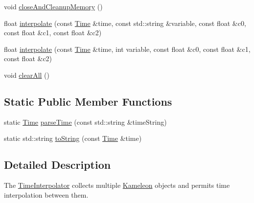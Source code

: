 \begin{DoxyCompactItemize}
\item 
void \hyperlink{classccmc_1_1_time_interpolator_ab1063eb20024f1f3e9923b1cff0a4060}{close\-And\-Cleanup\-Memory} ()
\item 
float \hyperlink{classccmc_1_1_time_interpolator_ab80987872d9d6d58c49d30a86e499e86}{interpolate} (const \hyperlink{classccmc_1_1_time}{Time} \&time, const std\-::string \&variable, const float \&c0, const float \&c1, const float \&c2)
\item 
float \hyperlink{classccmc_1_1_time_interpolator_ac8a3ca21476a05edf2ea427369266505}{interpolate} (const \hyperlink{classccmc_1_1_time}{Time} \&time, int variable, const float \&c0, const float \&c1, const float \&c2)
\item 
void \hyperlink{classccmc_1_1_time_interpolator_a6295ebae47e50a0d80fd646a294d4ccd}{clear\-All} ()
\end{DoxyCompactItemize}
\subsection*{Static Public Member Functions}
\begin{DoxyCompactItemize}
\item 
static \hyperlink{classccmc_1_1_time}{Time} \hyperlink{classccmc_1_1_time_interpolator_a0d265523f630f65ba2f905cda85a66eb}{parse\-Time} (const std\-::string \&time\-String)
\item 
static std\-::string \hyperlink{classccmc_1_1_time_interpolator_ab14064752057b303dce510fd9b44caf2}{to\-String} (const \hyperlink{classccmc_1_1_time}{Time} \&time)
\end{DoxyCompactItemize}


\subsection{Detailed Description}
The \hyperlink{classccmc_1_1_time_interpolator}{Time\-Interpolator} collects multiple \hyperlink{classccmc_1_1_kameleon}{Kameleon} objects and permits time interpolation between them. 

